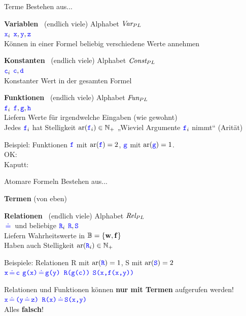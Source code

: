 \begin{frame}{Terme}
	Bestehen aus... \\
	\medskip
	
	\textbf{Variablen} \, (endlich viele) \quad Alphabet $\VPL$ \\
	$\word{x}_i$ \quad $\word x, \word y, \word z$ \\
	Können in einer Formel beliebig verschiedene Werte annehmen \\
	\medskip \pause
	
	\textbf{Konstanten} \, (endlich viele) \quad Alphabet $\CPL$ \\
	$\word{c}_i$ \quad $\word c, \word d$ \\
	Konstanter Wert in der gesamten Formel \\
	\medskip \pause
	
	\textbf{Funktionen} \, (endlich viele) \quad Alphabet $\FPL$ \\
	$\word{f}_i$ \quad $\word f, \word g, \word h$ \\
	Liefern Werte für irgendwelche Eingaben (wie gewohnt) \\
	Jedes $\word{f}_i$ hat Stelligkeit $\ar(\word{f}_i) \in \N_+$ \quad „Wieviel Argumente $\word{f}_i$ nimmt“ {\small (Arität)} \\
	\smallskip \pause
	
	Beispiel: 
	\quad Funktionen $\word f$ mit $\ar(\word f) = 2$, \quad $\word g$ mit $\ar(\word g) = 1$. \\ \pause
	\quad OK: \qquad {} \qquad {} \qquad {} \\
	\quad Kaputt: \qquad {} \qquad {} \qquad {} \qquad {}
\end{frame}

\begin{frame}{Atomare Formeln}
	Bestehen aus... \\
	\medskip
	
	\textbf{Termen} (von eben) \\
	\medskip
	
	\textbf{Relationen} \, (endlich viele) \quad Alphabet $\RPL$  \\
	$\pleq$ und beliebige $\word R_i$ \quad $\word R, \word S$ \\
	Liefern Wahrheitswerte in $\BB = \set{\W, \F}$ \\
	Haben auch Stelligkeit $\ar(\word R_i) \in \N_+$ \\
	\medskip \pause
	
	Beispiele: \quad Relationen \word R mit $\ar(\word R) = 1$, \quad \word S mit $\ar(\word S) = 2$ \\
	\quad $\word x \pleq \word c$ \qquad $\word{g(x)} \pleq \word{g(y)}$ \qquad $\word{R(g(c))}$ \qquad $\word{S(x,f(x,y))}$
	\medskip \pause
	
	Relationen und Funktionen können \textbf{nur mit Termen} aufgerufen werden! \\
	\impl \quad $\word x \pleq \word{(}\word y \pleq \word z\word{)}$ \qquad {} \qquad {} \qquad $\word{R(x)} \pleq \word{S(x,y)}$ \\
	Alles \textbf{falsch}!
\end{frame}

